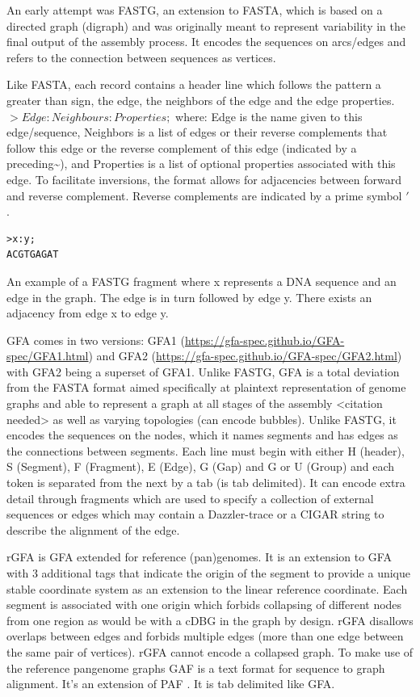 \documentclass[10pt, a4paper]{article}
\begin{document}
An early attempt was FASTG,  an extension to FASTA, which is based on a directed
graph (digraph) and was originally meant to represent variability in the final
output of the assembly process.
It encodes the sequences on arcs/edges and refers to the connection
between sequences as vertices.

Like FASTA, each record contains a header line which follows the pattern
a greater than sign, the edge, the neighbors of the edge and the edge properties.
\(>Edge:Neighbours:Properties;\) where: Edge is the name given to this
edge/sequence, Neighbors is a list of edges or their reverse complements that
follow this edge or the reverse complement of this edge
(indicated by a preceding\textasciitilde{}), and Properties is a list of optional properties
associated with this edge. To facilitate
inversions, the format allows for adjacencies between forward and reverse
complement. Reverse complements are indicated by a prime symbol \('\)
.


\begin{verbatim}
>x:y;
ACGTGAGAT
\end{verbatim}
An example of a FASTG fragment where x represents
a DNA sequence and an edge in the graph. The edge is in turn followed by edge y.
There exists an adjacency from edge x to edge y.

GFA \cite{liMinimapMiniasmFast2016} comes in two versions:
GFA1 (\url{https://gfa-spec.github.io/GFA-spec/GFA1.html}) and
GFA2 (\url{https://gfa-spec.github.io/GFA-spec/GFA2.html}) with GFA2 being a superset
of GFA1.
Unlike FASTG, GFA is a total deviation from the FASTA format aimed specifically
at plaintext representation of genome graphs and able to represent a graph at
all stages of the assembly <citation needed> as well as varying topologies
(can encode bubbles).
Unlike FASTG, it encodes the sequences on the nodes, which it names segments and
has edges as the connections between segments.
Each line must begin with either H (header), S (Segment), F (Fragment), E (Edge),
G (Gap) and G or U (Group) and each token is separated from the next by a tab
(is tab delimited).
It can encode extra detail through fragments which are used to specify a
collection of external sequences or edges which may contain a Dazzler-trace or
a CIGAR string to describe the alignment of the edge.

rGFA \cite{liDesignConstructionReference2020} is GFA extended for reference
(pan)genomes. It is an extension
to GFA with 3 additional tags that indicate the origin of the segment to
provide a unique stable coordinate system as an extension to the linear
reference coordinate. Each segment is associated with one origin which forbids
collapsing of different nodes from one region as would be with a cDBG  in the
graph by design. rGFA disallows overlaps between edges and forbids multiple
edges (more than one edge between the same pair of vertices).
rGFA cannot encode a collapsed graph.
To make use of the reference pangenome graphs
GAF \cite{liDesignConstructionReference2020} is a text format
for sequence to graph alignment.
It’s an extension of PAF \cite{liMinimapMiniasmFast2016}.
It is tab delimited like GFA. 
\end{document}
